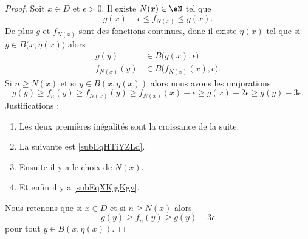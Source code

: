 \begin{proof}
	Soit \( x\in D\) et \( \epsilon>0\). Il existe \( N(x)\in \eN\) tel que
	\begin{equation}
		g(x)-\epsilon\leq f_{N(x)}\leq g(x).
	\end{equation}
	De plus \( g\) et \( f_{N(x)}\) sont des fonctions continues, donc il existe \( \eta(x)\) tel que si \( y\in B\big( x,\eta(x) \big)\) alors
	\begin{subequations}
		\begin{align}
			g(y)        & \in B\big( g(x),\epsilon \big) \label{subEqXKjgKgv}           \\
			f_{N(x)}(y) & \in B\big( f_{N(x)}(x),\epsilon \big)   \label{subEqHTiYZLd}.
		\end{align}
	\end{subequations}
	Si \( n\geq N(x)\) et si \( y\in B(x,\eta(x))\) alors nous avons les majorations
	\begin{equation}
		g(y)\geq f_n(y)
		\geq f_{N(x)}(y)
		\geq f_{N(x)}(x)-\epsilon
		\geq g(x)-2\epsilon
		\geq g(y)-3\epsilon.
	\end{equation}
	Justifications :
	\begin{multicols}{2}
		\begin{enumerate}
			\item
			      Les deux premières inégalités sont la croissance de la suite.
			\item
			      La suivante est \eqref{subEqHTiYZLd}.
			\item
			      Ensuite il y a le choix de \( N(x)\).
			\item
			      Et enfin il y a \eqref{subEqXKjgKgv}.
		\end{enumerate}
	\end{multicols}
	Nous retenons que si \( x\in D\) et si \( n\geq N(x)\) alors
	\begin{equation}    \label{EqJCMktdj}
		g(y)\geq f_n(y)\geq g(y)-3\epsilon
	\end{equation}
	pour tout \( y\in B(x,\eta(x))\).


\end{proof}
